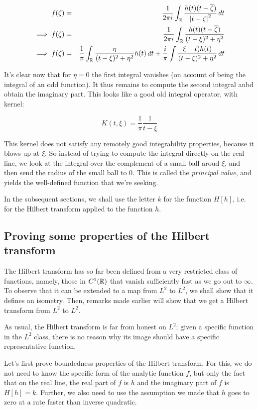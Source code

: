 \documentclass[a4paper]{amsart}
\begin{document}
\begin{eqnarray*}
  f(\zeta) & = & \frac{1}{2\pi i} \int_{\mathbb{R}} \frac{h(t)(t - \overline{\zeta})}{\left|t - \zeta\right|^2} \, dt\\
  \implies f(\zeta) & = & \frac{1}{2\pi i} \int_{\mathbb{R}} \frac{h(t)(t - \overline{\zeta})}{(t - \xi)^2 + \eta^2}\\
  \implies f(\zeta) & = & \frac{1}{\pi} \int_{\mathbb{R}} \frac{\eta}{(t - \xi)^2 + \eta^2} h(t) \, dt + \frac{i}{\pi} \int \frac{\xi - t)h(t)}{(t - \xi)^2 + \eta^2} \, dt
\end{eqnarray*}

It's clear now that for $\eta = 0$ the first integral vanishes (on
account of being the integral of an odd function). It thus remains to
compute the second integral anbd obtain the imaginary part. This looks
like a good old integral operator, with kernel:

$$K(t,\xi) = \frac{1}{\pi} \frac{1}{t - \xi}$$

This kernel does not satisfy any remotely good integrability
properties, because it blows up at $\xi$. So instead of trying to
compute the integral directly on the real line, we look at the
integral over the complement of a small ball aroud $\xi$, and then
send the radius of the small ball to $0$. This is called the {\em
  principal value}, and yields the well-defined function that we're seeking.

In the subsequent sections, we shall use the letter $k$ for the
function $H[h]$, i.e. for the Hilbert transform applied to the
function $h$.
\subsection{Proving some properties of the Hilbert transform}

The Hilbert transform has so far been defined from a very restricted
class of functions, namely, those in $C^1(\mathbb{R})$ that vanish
sufficiently fast as we go out to $\infty$. To observe that it can be
extended to a map from $L^2$ to $L^2$, we shall show that it defines
an isometry. Then, remarks made earlier will show that we get a
Hilbert transform from $L^2$ to $L^2$.

As usual, the Hilbert transform is far from honest on $L^2$; given a
specific function in the $L^2$ class, there is no reason why its image
should have a specific representative function.

Let's first prove boundedness properties of the Hilbert transform. For
this, we do not need to know the specific form of the analytic
function $f$, but only the fact that on the real line, the real part
of $f$ is $h$ and the imaginary part of $f$ is $H[h] = k$. Further, we
also need to use the assumption we made that $h$ goes to zero at a
rate faster than inverse quadratic.
\end{document}
